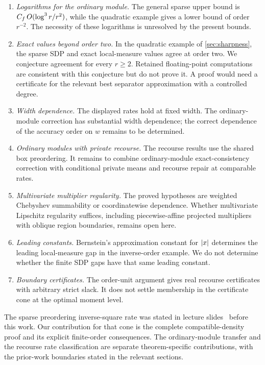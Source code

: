 \begin{enumerate}
\item \emph{Logarithms for the ordinary module.} The general sparse upper
  bound is $C_f\,O(\log^3r/r^2)$, while the quadratic example gives a lower
  bound of order $r^{-2}$. The necessity of these logarithms is unresolved
  by the present bounds.
\item \emph{Exact values beyond order two.} In the quadratic example of
  \cref{sec:sharpness}, the sparse SDP and exact local-measure values agree
  at order two. We conjecture agreement for every $r\ge2$. Retained
  floating-point computations are consistent with this conjecture but do
  not prove it. A proof would need a certificate for the relevant best
  separator approximation with a controlled degree.
\item \emph{Width dependence.} The displayed rates hold at fixed width.
  The ordinary-module correction has substantial width dependence; the
  correct dependence of the accuracy order on $w$ remains to be determined.
\item \emph{Ordinary modules with private recourse.} The recourse results
  use the shared box preordering. It remains to combine ordinary-module
  exact-consistency correction with conditional private means and recourse
  repair at comparable rates.
\item \emph{Multivariate multiplier regularity.} The proved hypotheses are
  weighted Chebyshev summability or coordinatewise dependence. Whether
  multivariate Lipschitz regularity suffices, including piecewise-affine
  projected multipliers with oblique region boundaries, remains open here.
\item \emph{Leading constants.} Bernstein's approximation constant for
  $\lvert x\rvert$ determines the leading local-measure gap in the inverse-order
  example. We do not determine whether the finite SDP gaps have that same
  leading constant.
\item \emph{Boundary certificates.} The order-unit argument gives real
  recourse certificates with arbitrary strict slack. It does not settle
  membership in the certificate cone at the optimal moment level.
\end{enumerate}

The sparse preordering inverse-square rate was stated in lecture
slides~\cite{magron2025slides-lorentz,magron2026slides-tenors} before this
work. Our contribution for that cone is the complete compatible-density
proof and its explicit finite-order consequences. The ordinary-module
transfer and the recourse rate classification are separate theorem-specific
contributions, with the prior-work boundaries stated in the relevant
sections.
